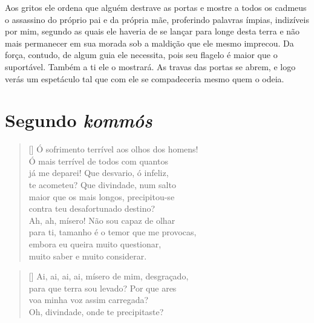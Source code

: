    Aos gritos ele ordena que alguém destrave as portas e mostre a todos os
cadmeus o assassino do próprio pai e da própria mãe, proferindo palavras
ímpias, indizíveis por mim, segundo as quais ele haveria de se
lançar para longe desta terra e não mais permanecer em sua morada sob a
maldição que ele mesmo imprecou. Da força, contudo, de algum guia ele
necessita, pois seu flagelo é maior que o suportável. Também a ti ele o
mostrará. As travas das portas se abrem, e logo verás um espetáculo tal
que com ele se compadeceria mesmo quem o odeia.


\section{Segundo \emph{kommós}}




\settowidth{\versewidth}{para ti, tamanho é o temor que me provocas,}
\begin{verse}[\versewidth] Ó sofrimento terrível aos olhos dos homens!\\
Ó mais terrível de todos com quantos\\
já me deparei! Que desvario, ó infeliz,\\
te acometeu? Que divindade, num salto\\
maior que os mais longos, precipitou-se\\
contra teu desafortunado destino?\\
Ah, ah, mísero! Não sou capaz de olhar\\
para ti, tamanho é o temor que me provocas,\\
embora eu queira muito questionar,\\
muito saber e muito considerar.
\end{verse}


\settowidth{\versewidth}{para que terra sou levado? Por que aresx}
\begin{verse}[\versewidth]
Ai, ai, ai, ai, mísero de mim, desgraçado,\\
para que terra sou levado? Por que ares\\
voa minha voz assim carregada?\\
Oh, divindade, onde te precipitaste?
\end{verse}

